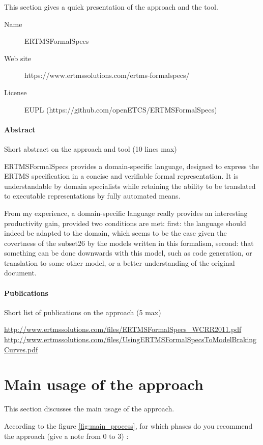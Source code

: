 This section gives a quick presentation of the approach and the tool.

\begin{description}
\item[Name] ERTMSFormalSpecs
\item[Web site] https://www.ertmssolutions.com/ertms-formalspecs/
\item[License] EUPL (https://github.com/openETCS/ERTMSFormalSpecs)
\end{description}

\paragraph{Abstract} Short abstract on the approach and tool (10 lines max)

ERTMSFormalSpecs provides a domain-specific language, designed to express the ERTMS specification in a concise and verifiable formal representation. It is understandable by domain specialists while retaining the ability to be translated to executable representations by fully automated means.

\begin{assessor1}
From my experience, a domain-specific language really provides an interesting productivity gain, provided two conditions are met: first: the language should indeed be adapted to the domain, which seems to be the case given the covertness of the subset26 by the models written in this formalism, second: that something can be done downwards with this model, such as code generation, or translation to some other model, or a better understanding of the original document. 
\end{assessor1}

\paragraph{Publications} Short list of publications on the approach (5 max)

\url{http://www.ertmssolutions.com/files/ERTMSFormalSpecs\_WCRR2011.pdf   }
\url{http://www.ertmssolutions.com/files/UsingERTMSFormalSpecsToModelBrakingCurves.pdf}

\section{Main usage of the approach}
\label{main_usage}
This section discusses the main usage of the approach.

According to the figure \ref{fig:main_process}, for which phases do you recommend the approach (give a note from 0 to  3) :

